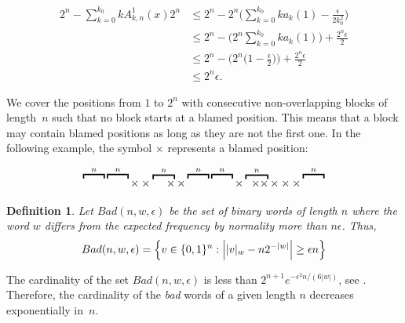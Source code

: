 \documentclass[11pt,a4paper]{tesis}
\newtheorem{definition}{Definition}[]
\begin{document}
\begin{align*}
   2^n -  \sum_{k=0}^{k_0} kA^{1}_{k,n}(x) 2^n 
     &\leq 2^n - 2^n\Big(\sum_{k=0}^{k_0} k a_k(1) - \frac{\epsilon}{2k^2_0}\Big) \\
    &\leq 2^n -  \Big(2^n \sum_{k=0}^{k_0} ka_{k}(1)\Big) + \frac{2^n\epsilon}{2}\\
    &\leq 2^n - \Big(2^n \big(1-\frac{\epsilon}{2}\big)\Big) + \frac{2^n\epsilon }{2} \\
    &\leq 2^n\epsilon.
\end{align*}

We cover the positions from $1 $ to $2^n$ with consecutive
 non-overlapping blocks of length~$n$ such that 
no block starts at a blamed  position. 
This means that a block may contain blamed positions as long as they are not the first one. 
In the following example, the symbol $\times$ represents a blamed position:
 
$$\overbracket{\raisebox{6.4pt}{\qquad}}^{n} \overbracket{\raisebox{6.4pt}{\qquad}}^{n}\times\times\overbracket{\;\quad \times}^{n} \times \overbracket{\raisebox{6.4pt}{\qquad}}^{n} \overbracket{\raisebox{6.4pt}{\qquad}}^{n} \times \overbracket{\;\; \times \times}^{n} \times\times\times \overbracket{\raisebox{6.4pt}{\qquad}}^{n}$$


\begin{definition}
  Let $Bad(n, w, \epsilon)$ be the set of binary words of length $n$ where the word $w$ differs from the expected frequency by normality
 more than $n \epsilon$. Thus,
  $$Bad(n, w, \epsilon)=\Big{\{}v\in \{0,1\}^n: \Big{|} |v|_w - n 2^{-|w|} \Big{|} \geq \epsilon n \Big{\} }$$
\end{definition}


The cardinality of the set $Bad(n, w, \epsilon)$ is less than $2^{n+1} e^{-\epsilon^2 n/(6|w|)}$,
see \cite[Lemma 7.3.5]{BC2018}. Therefore, the cardinality of the  \textit{bad} words of a given length $n$ decreases exponentially in~$n$.
\end{document}

